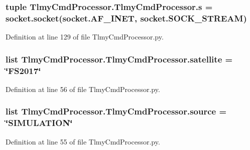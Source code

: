 \subsubsection[{s}]{\setlength{\rightskip}{0pt plus 5cm}tuple Tlmy\+Cmd\+Processor.\+Tlmy\+Cmd\+Processor.\+s = socket.\+socket(socket.\+A\+F\+\_\+\+I\+N\+E\+T, socket.\+S\+O\+C\+K\+\_\+\+S\+T\+R\+E\+A\+M)}\label{namespace_tlmy_cmd_processor_1_1_tlmy_cmd_processor_a5b740cec8cab496e71b6896c16dfba9d}


Definition at line 129 of file Tlmy\+Cmd\+Processor.\+py.

\hypertarget{namespace_tlmy_cmd_processor_1_1_tlmy_cmd_processor_a5cf95a9cff868554c46d7a901df74673}{}
\subsubsection[{satellite}]{\setlength{\rightskip}{0pt plus 5cm}list Tlmy\+Cmd\+Processor.\+Tlmy\+Cmd\+Processor.\+satellite = \char`\"{}F\+S2017\char`\"{}}\label{namespace_tlmy_cmd_processor_1_1_tlmy_cmd_processor_a5cf95a9cff868554c46d7a901df74673}


Definition at line 56 of file Tlmy\+Cmd\+Processor.\+py.

\hypertarget{namespace_tlmy_cmd_processor_1_1_tlmy_cmd_processor_acef2a3d30bda6af9c56309eea6b12246}{}
\subsubsection[{source}]{\setlength{\rightskip}{0pt plus 5cm}list Tlmy\+Cmd\+Processor.\+Tlmy\+Cmd\+Processor.\+source = \char`\"{}S\+I\+M\+U\+L\+A\+T\+I\+O\+N\char`\"{}}\label{namespace_tlmy_cmd_processor_1_1_tlmy_cmd_processor_acef2a3d30bda6af9c56309eea6b12246}


Definition at line 55 of file Tlmy\+Cmd\+Processor.\+py.

\hypertarget{namespace_tlmy_cmd_processor_1_1_tlmy_cmd_processor_a9d8c45d2e203eaa7eb7be5ece0116d39}{}
